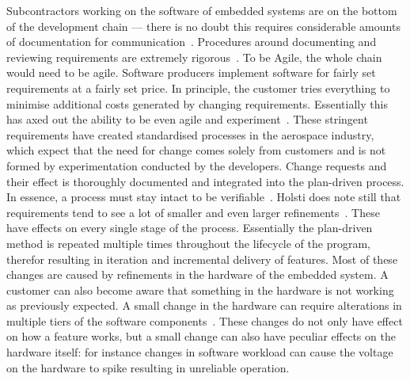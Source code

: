 \documentclass[english]{tktltiki2}
\begin{document}
Subcontractors working on the software of embedded systems are on the bottom of the development chain — there is no doubt this requires considerable amounts of documentation for communication~\cite{BT15, Hol15b}. Procedures around documenting and reviewing requirements are extremely rigorous~\cite{Hol15b}. To be Agile, the whole chain would need to be agile. Software producers implement software for fairly set requirements at a fairly set price. In principle, the customer tries everything to minimise additional costs generated by changing requirements. Essentially this has axed out the ability to be even agile and experiment~\cite{Hol15b}. These stringent requirements have created standardised processes in the aerospace industry, which expect that the need for change comes solely from customers and is not formed by experimentation conducted by the developers. Change requests and their effect is thoroughly documented and integrated into the plan-driven process. In essence, a process must stay intact to be verifiable~\cite{Hol15b}. Holsti does note still that requirements tend to see a lot of smaller and even larger refinements~\cite{Hol15b}. These have effects on every single stage of the process. Essentially the plan-driven method is repeated multiple times throughout the lifecycle of the program, therefor resulting in iteration and incremental delivery of features. Most of these changes are caused by refinements in the hardware of the embedded system. A customer can also become aware that something in the hardware is not working as previously expected. A small change in the hardware can require alterations in multiple tiers of the software components~\cite{Hol15b}. These changes do not only have effect on how a feature works, but a small change can also have peculiar effects on the hardware itself: for instance changes in software workload can cause the voltage on the hardware to spike resulting in unreliable operation.
\end{document}
